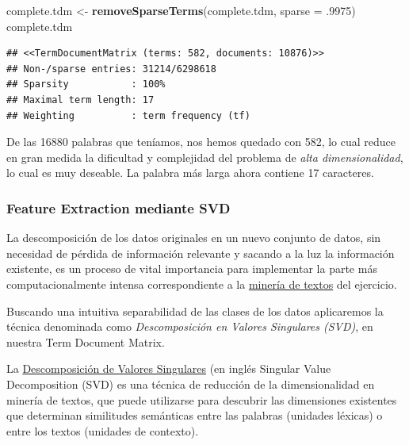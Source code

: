 \documentclass[]{article}
\newenvironment{Shaded}{\begin{snugshade}}{\end{snugshade}}
\newcommand{\DataTypeTok}[1]{\textcolor[rgb]{0.13,0.29,0.53}{#1}}
\newcommand{\FloatTok}[1]{\textcolor[rgb]{0.00,0.00,0.81}{#1}}
\newcommand{\KeywordTok}[1]{\textcolor[rgb]{0.13,0.29,0.53}{\textbf{#1}}}
\newcommand{\NormalTok}[1]{#1}
\newcommand{\StringTok}[1]{\textcolor[rgb]{0.31,0.60,0.02}{#1}}
\begin{document}
\begin{Shaded}
\begin{Highlighting}[]
\NormalTok{complete.tdm <-}\StringTok{ }\KeywordTok{removeSparseTerms}\NormalTok{(complete.tdm, }\DataTypeTok{sparse =} \FloatTok{.9975}\NormalTok{)}
\NormalTok{complete.tdm}
\end{Highlighting}
\end{Shaded}

\begin{verbatim}
## <<TermDocumentMatrix (terms: 582, documents: 10876)>>
## Non-/sparse entries: 31214/6298618
## Sparsity           : 100%
## Maximal term length: 17
## Weighting          : term frequency (tf)
\end{verbatim}

De las 16880 palabras que teníamos, nos hemos quedado con 582, lo cual
reduce en gran medida la dificultad y complejidad del problema de
\emph{alta dimensionalidad}, lo cual es muy deseable. La palabra más larga ahora
contiene 17 caracteres.

\hypertarget{feature-extraction-mediante-singular-value-decomposition}{%
\subsubsection{Feature Extraction mediante SVD}\label{feature-extraction-mediante-singular-value-decomposition}}

La descomposición de los datos originales en un nuevo conjunto de datos, sin
necesidad de pérdida de información relevante y sacando a la luz la
información existente, es un proceso de vital importancia para implementar
la parte más computacionalmente intensa correspondiente a la \href{https://es.wikipedia.org/wiki/Miner\%C3\%ADa_de_textos}{\color{blue}minería de textos} del ejercicio. 

Buscando una intuitiva separabilidad de las clases de los datos aplicaremos la
técnica denominada como \emph{Descomposición en Valores Singulares (SVD)}, en nuestra Term Document Matrix.

\begin{tcolorbox}
	La \href{https://es.wikipedia.org/wiki/Descomposici\%C3\%B3n_en_valores_singulares}{\color{blue}Descomposición de Valores Singulares} (en inglés Singular Value Decomposition (SVD) es una técnica de reducción de la dimensionalidad en minería de textos, que puede utilizarse para descubrir las dimensiones existentes que determinan similitudes semánticas entre las palabras (unidades léxicas) o entre los textos (unidades de	contexto).
\end{tcolorbox}
\end{document}
